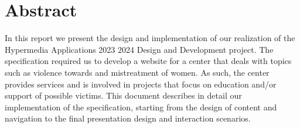 \section{Abstract}
In this report we present the design and implementation of our realization of the Hypermedia Applications 2023 2024 Design and Development project.
The specification required us to develop a website for a center that deals with topics such as violence towards and mistreatment of women. As such,
the center provides services and is involved in projects that focus on education and/or support of possible victims. This document describes in detail
our implementation of the specification, starting from the design of content and navigation to the final presentation design and interaction scenarios.
